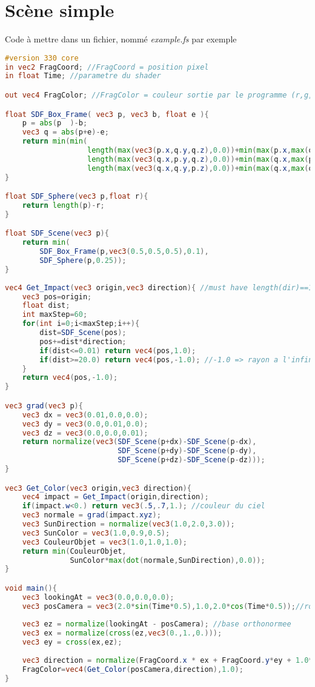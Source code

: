 \section{Scène simple}
Code à mettre dans un fichier, nommé \emph{example.fs} par exemple
\begin{lstlisting}[language=GLSL]
#version 330 core
in vec2 FragCoord; //FragCoord = position pixel
in float Time; //parametre du shader

out vec4 FragColor; //FragColor = couleur sortie par le programme (r,g,b,a)

float SDF_Box_Frame( vec3 p, vec3 b, float e ){
    p = abs(p  )-b;
    vec3 q = abs(p+e)-e;
    return min(min(
                   length(max(vec3(p.x,q.y,q.z),0.0))+min(max(p.x,max(q.y,q.z)),0.0),
                   length(max(vec3(q.x,p.y,q.z),0.0))+min(max(q.x,max(p.y,q.z)),0.0)),
                   length(max(vec3(q.x,q.y,p.z),0.0))+min(max(q.x,max(q.y,p.z)),0.0));
}

float SDF_Sphere(vec3 p,float r){
    return length(p)-r;
}

float SDF_Scene(vec3 p){
    return min(
        SDF_Box_Frame(p,vec3(0.5,0.5,0.5),0.1),
        SDF_Sphere(p,0.25));
}
    
vec4 Get_Impact(vec3 origin,vec3 direction){ //must have length(dir)==1 
    vec3 pos=origin;
    float dist;
    int maxStep=60;
    for(int i=0;i<maxStep;i++){
        dist=SDF_Scene(pos);
        pos+=dist*direction;
        if(dist<=0.01) return vec4(pos,1.0);
        if(dist>=20.0) return vec4(pos,-1.0); //-1.0 => rayon a l'infini
    }
    return vec4(pos,-1.0);
}

vec3 grad(vec3 p){
    vec3 dx = vec3(0.01,0.0,0.0);
    vec3 dy = vec3(0.0,0.01,0.0);
    vec3 dz = vec3(0.0,0.0,0.01);
    return normalize(vec3(SDF_Scene(p+dx)-SDF_Scene(p-dx),
                          SDF_Scene(p+dy)-SDF_Scene(p-dy),
                          SDF_Scene(p+dz)-SDF_Scene(p-dz)));
}

vec3 Get_Color(vec3 origin,vec3 direction){
    vec4 impact = Get_Impact(origin,direction);
    if(impact.w<0.) return vec3(.5,.7,1.); //couleur du ciel
    vec3 normale = grad(impact.xyz);
    vec3 SunDirection = normalize(vec3(1.0,2.0,3.0));
    vec3 SunColor = vec3(1.0,0.9,0.5);
    vec3 CouleurObjet = vec3(1.0,1.0,1.0);
    return min(CouleurObjet,
               SunColor*max(dot(normale,SunDirection),0.0));
}

void main(){
    vec3 lookingAt = vec3(0.0,0.0,0.0);
    vec3 posCamera = vec3(2.0*sin(Time*0.5),1.0,2.0*cos(Time*0.5));//rotating Camera
    
    vec3 ez = normalize(lookingAt - posCamera); //base orthonormee
    vec3 ex = normalize(cross(ez,vec3(0.,1.,0.)));
    vec3 ey = cross(ex,ez);
    
    vec3 direction = normalize(FragCoord.x * ex + FragCoord.y*ey + 1.0*ez);
    FragColor=vec4(Get_Color(posCamera,direction),1.0);
}

\end{lstlisting}